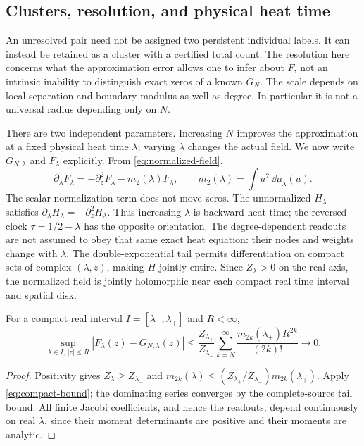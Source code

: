 \subsection{Clusters, resolution, and physical heat time}
\label{sec:cluster-resolution}

An unresolved pair need not be assigned two persistent individual labels.
It can instead be retained as a cluster with a certified total count.
The resolution here concerns what the approximation error allows one to
infer about \(F\), not an intrinsic inability to distinguish exact zeros
of a known \(G_N\). The scale depends on local separation and boundary
modulus as well as degree. In particular it is not a universal radius
depending only on \(N\).

There are two independent parameters. Increasing \(N\) improves the
approximation at a fixed physical heat time \(\lambda\); varying
\(\lambda\) changes the actual field. We now write \(G_{N,\lambda}\)
and \(F_\lambda\) explicitly. From \eqref{eq:normalized-field},
\begin{equation}
 \partial_\lambda F_\lambda
 =-\partial_z^2F_\lambda-m_2(\lambda)F_\lambda,
 \qquad m_2(\lambda)=\int u^2\,\dd\mu_\lambda(u).
 \label{eq:normalized-heat}
\end{equation}
The scalar normalization term does not move zeros. The unnormalized
\(H_\lambda\) satisfies \(\partial_\lambda H_\lambda=-\partial_z^2H_\lambda\).
Thus increasing \(\lambda\) is backward heat time; the reversed clock
\(\tau=1/2-\lambda\) has the opposite orientation.
The degree-dependent readouts are not assumed to obey that same exact
heat equation: their nodes and weights change with \(\lambda\).
The double-exponential tail permits differentiation on compact sets of
complex \((\lambda,z)\), making \(H\) jointly entire. Since
\(Z_\lambda>0\) on the real axis, the normalized field is jointly
holomorphic near each compact real time interval and spatial disk.

\begin{proposition}
\label{prop:uniform-heat-compact}
For a compact real interval \(I=[\lambda_-,\lambda_+]\) and \(R<\infty\),
\begin{equation}
 \sup_{\lambda\in I,\,|z|\le R}|F_\lambda(z)-G_{N,\lambda}(z)|
 \le \frac{Z_{\lambda_+}}{Z_{\lambda_-}}
       \sum_{k=N}^\infty\frac{m_{2k}(\lambda_+)R^{2k}}{(2k)!}
 \longrightarrow0.
 \label{eq:uniform-heat-compact}
\end{equation}
\end{proposition}
\begin{proof}
Positivity gives \(Z_\lambda\ge Z_{\lambda_-}\) and
\(m_{2k}(\lambda)\le
(Z_{\lambda_+}/Z_{\lambda_-})m_{2k}(\lambda_+)\).
Apply \eqref{eq:compact-bound}; the dominating series converges by the
complete-source tail bound. All finite Jacobi coefficients, and hence
the readouts, depend continuously on real \(\lambda\), since their
moment determinants are positive and their moments are analytic.
\end{proof}

